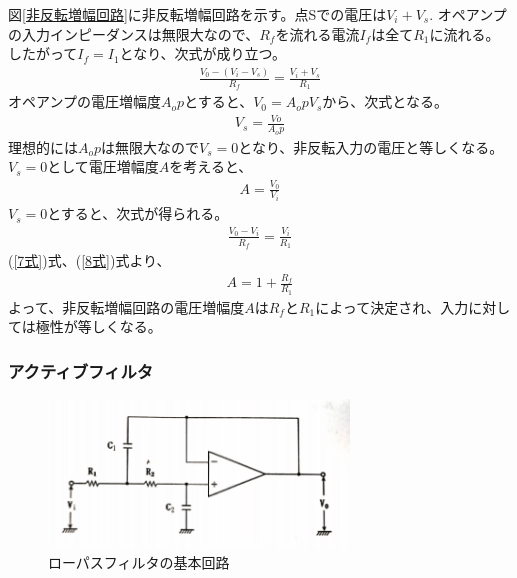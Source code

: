 \documentclass[a4paper,11pt,uplatex]{jsarticle}
\begin{document}
図\ref{非反転増幅回路}に非反転増幅回路を示す。点Sでの電圧は$V_i+V_s$. オペアンプの入力インピーダンスは無限大なので、$R_f$を流れる電流$I_f$は全て$R_1$に流れる。
したがって$I_f=I_1$となり、次式が成り立つ。
\begin{align}
  \frac{V_0 - (V_i - V_s)}{R_f} = \frac{V_i + V_s}{R_1}
\end{align}
オペアンプの電圧増幅度$A_op$とすると、$V_0 = A_opV_s$から、次式となる。
\begin{align}
  V_s = \frac{Vo}{A_op}
\end{align}
理想的には$A_op$は無限大なので$V_s = 0$となり、非反転入力の電圧と等しくなる。$V_s = 0$として電圧増幅度$A$を考えると、
\begin{align}
  \label{7式}
  A = \frac{V_0}{V_i}
\end{align}
$V_s = 0$とすると、次式が得られる。
\begin{align}
  \label{8式}
  \frac{V_0-V_i}{R_f} = \frac{V_i}{R_1}
\end{align}
(\ref{7式})式、(\ref{8式})式より、
\begin{align}
  A = 1 + \frac{R_f}{R_1}
\end{align}
よって、非反転増幅回路の電圧増幅度$A$は$R_f$と$R_1$によって決定され、入力に対しては極性が等しくなる。

\subsubsection{アクティブフィルタ}

\begin{figure}[H]
	\begin{center}
		\includegraphics[width=8cm]{画像/アクティブフィルタ.png}
		\caption{ローパスフィルタの基本回路}
		\label{アクティブフィルタ}
	\end{center}
\end{figure}
\end{document}
